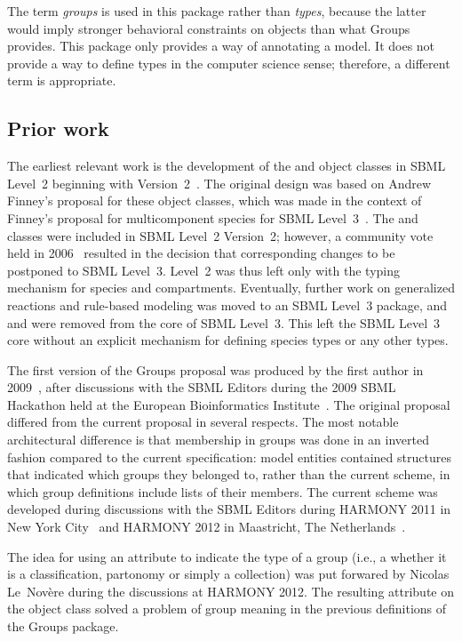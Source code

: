 The term \emph{groups} is used in this package rather than \emph{types}, because the latter would imply stronger behavioral constraints on objects than what Groups provides. This package only provides a way of annotating a model.  It does not provide a way to define types in the computer science sense; therefore, a different term is appropriate.


\subsection{Prior work}

The earliest relevant work is the development of the \CompartmentType and \SpeciesType object classes in SBML Level~2 beginning with Version~2~\citep{l2v2}. The original design was based on Andrew Finney's proposal for these object classes, which was made in the context of Finney's proposal for multicomponent species for SBML Level~3~\citep{finney_2004}.  The \SpeciesType and \CompartmentType classes were included in SBML Level~2 Version~2; however, a community vote held in 2006~\citep{vote_2006b} resulted in the decision that corresponding changes to \Reaction be postponed to SBML Level~3.  Level~2 was thus left only with the typing mechanism for species and compartments.  Eventually, further work on generalized reactions and rule-based modeling was moved to an SBML Level~3 package, and \SpeciesType and \CompartmentType were removed from the core of SBML Level~3.  This left the SBML Level~3 core without an explicit mechanism for defining species types or any other types.

The first version of the Groups proposal was produced by the first author in 2009~\citep{hucka_2009}, after discussions with the SBML Editors during the 2009 SBML Hackathon held at the European Bioinformatics Institute~\citep{sbml_hackathon_2009}.  The original proposal differed from the current proposal in several respects. The most notable architectural difference is that membership in groups was done in an inverted fashion compared to the current specification: model entities contained structures that indicated which groups they belonged to, rather than the current scheme, in which group definitions include lists of their members.  The current scheme was developed during discussions with the SBML Editors during HARMONY 2011 in New York City~\citep{harmony_2011} and HARMONY 2012 in Maastricht, The Netherlands~\citep{harmony_2012}.

The idea for using an attribute to indicate the type of a group (i.e., a whether it is a classification, partonomy or simply a collection) was put forwared by Nicolas Le~Nov\`{e}re during the discussions at HARMONY 2012.  The resulting attribute  on the \Group object class solved a problem of group meaning in the previous definitions of the Groups package.

